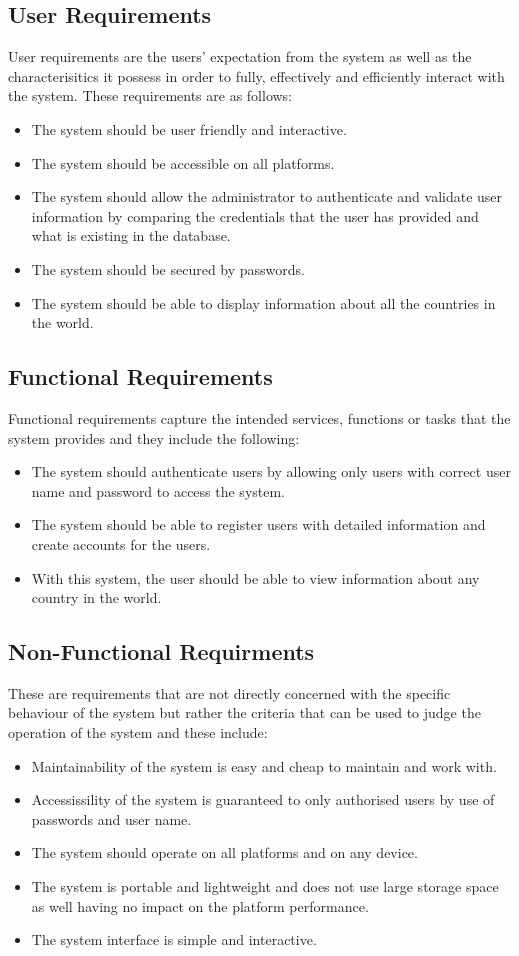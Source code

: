 \documentclass[twoside, a4paper, 12pt]{report}
\begin{document}
\subsection{User Requirements}
User requirements are the users' expectation from the system as well as the characterisitics it possess in order to fully, effectively and efficiently interact with the system. These requirements are as follows:
\begin{itemize}
	\item The system should be user friendly and interactive.
	\item The system should be accessible on all platforms.
	\item The system should allow the administrator to authenticate and validate user information by comparing the credentials that the user has provided and what is existing in the database.
	\item The system should be secured by passwords.
	\item The system should be able to display information about all the countries in the world.
\end{itemize}

\subsection{Functional Requirements}
Functional requirements capture the intended services, functions or tasks that the system provides and they include the following:
\begin{itemize}
	\item The system should authenticate users by allowing only users with correct user name and password to access the system.
	\item The system should be able to register users with detailed information and create accounts for the users.
	\item With this system, the user should be able to view information about any country in the world.
\end{itemize}

\subsection{Non-Functional Requirments}
These are requirements that are not directly concerned with the specific behaviour of the system but rather the criteria that can be used to judge the operation of the system and these include:
\begin{itemize}
	\item Maintainability of the system is easy and cheap to maintain and work with.
	\item Accessissility of the system is guaranteed to only authorised users by use of passwords and user name.
	\item The system should operate on all platforms and on any device.
	\item The system is portable and lightweight and does not use large storage space as well having no impact on the platform performance.
	\item The system interface is simple and interactive.
\end{itemize}
\end{document}
